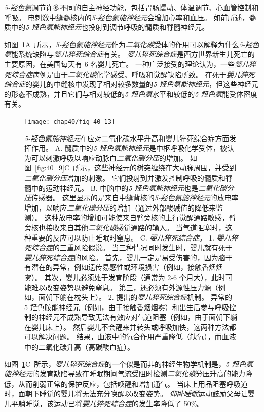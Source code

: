 \textit{5-羟色氨}调节许多不同的自主神经功能，包括胃肠蠕动、体温调节、心血管控制和呼吸。
电刺激中缝髓核内的\textit{5-羟色氨能神经元}会增加心率和血压。
如前所述，髓质中的\textit{5-羟色氨能神经元}也投射到调节呼吸的髓质和脊髓神经元。


如图~\ref{fig:40_13}A~所示，\textit{5-羟色氨能神经元}作为\textit{二氧化碳}受体的作用可以解释为什么\textit{5-羟色氨}能系统缺陷与\textit{婴儿猝死综合症}有关。
\textit{婴儿猝死综合症}是西方世界新生儿死亡的主要原因，在美国每天有 6 名婴儿死亡。
一种广泛接受的理论认为，一些\textit{婴儿猝死综合症}病例是由于\textit{二氧化碳}化学感受、呼吸和觉醒缺陷所致。
在死于\textit{婴儿猝死综合症}的婴儿的中缝核中发现了相对较多数量的\textit{5-羟色氨能神经元}，但这些神经元的形态不成熟，并且它们与相对较低的\textit{5-羟色氨}水平和较低的\textit{5-羟色氨}能受体密度有关。


\begin{figure}[htbp]
	\centering
	\texttt{[image: chap40/fig\_40\_13]}
	\caption{\textit{5-羟色氨能神经元}在应对二氧化碳水平升高和婴儿猝死综合症方面发挥作用。
		A. 髓质中的\textit{5-羟色氨能神经元}是中枢呼吸化学受体，被认为可以刺激呼吸以响应动脉血\textit{二氧化碳分压}的增加。
		如图~\ref{fig:40_9}C~所示，这些神经元的树突缠绕在大动脉周围，并受到\textit{二氧化碳分压}增加的刺激。
		它们投射到并激发控制呼吸的髓质和脊髓中的运动神经元。
		B. 中脑中的\textit{5-羟色氨能神经元}也是\textit{二氧化碳分压}传感器。
		这里显示的是来自中缝背核的\textit{5-羟色氨能神经元}的放电率增加，以响应\textit{二氧化碳分压}的增加（通过外部酸碱值的降低来监测）。
		这种放电率的增加可能使来自臂旁核的上行觉醒通路敏感，臂旁核也接收来自其他\textit{二氧化碳}感觉通路的输入。
		当气道阻塞时，这种重要的反应可以防止睡眠时窒息\cite{richerson2004serotonergic}。
		C. \textit{婴儿猝死综合症}。
		1. \textit{婴儿猝死综合症}的三重风险假说。
		当三种情况同时发生时，婴儿就有死于\textit{婴儿猝死综合症}的风险。
		首先，婴儿一定是易受伤害的，因为脑干有潜在的异常，例如遗传易感性或环境损害（例如，接触香烟烟雾）。
		其次，婴儿必须处于发育阶段（通常为 2-6 个月大），此时可能难以改变姿势以避免窒息。
		第三，还必须有外源性压力源（例如，面朝下躺在枕头上）\cite{filiano1994perspective}。
		2. 提出的\textit{婴儿猝死综合症}机制。
		异常的 5-羟色胺能神经元（例如，由于接触香烟烟雾）和出生后参与呼吸控制的神经元不成熟导致无法有效应对气道阻塞（例如，由于面朝下躺在婴儿床上）。
		然后婴儿不会醒来并转头或呼吸加快，这两种方法都可以解决问题。
		结果，血液中的氧合作用严重降低（缺氧），而血液中的二氧化碳升高（高碳酸血症）。}
	\label{fig:40_13}
\end{figure}


如图~\ref{fig:40_13}C~所示，\textit{婴儿猝死综合症}的一个似是而非的神经生物学机制是，\textit{5-羟色氨能神经元}的发育缺陷导致在睡眠期间气流受阻时检测\textit{二氧化碳}分压升高的能力降低，从而削弱正常的保护反应，包括唤醒和增加通气。
当床上用品阻塞呼吸道时，面朝下睡觉的婴儿将无法充分唤醒以改变姿势。
\textit{仰卧睡眠}运动鼓励父母让婴儿平躺睡觉，该运动已将\textit{婴儿猝死综合症}的发生率降低了 50\%。



